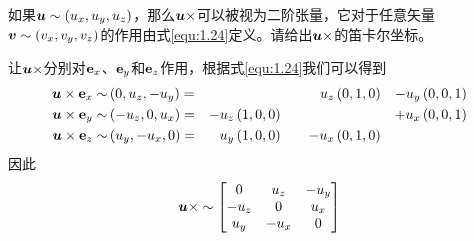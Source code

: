 \begin{example}
	如果$\bb{u}\sim \left( u_x,u_y,u_z \right) $，那么$\bb{u}\times $可以被视为二阶张量，它对于任意矢量$\bb{v}\sim \left( v_x,v_y,v_z \right) $的作用由式\eqref{equ:1.24}定义。请给出$\bb{u}\times $的笛卡尔坐标。
\end{example}
\begin{solution}
	让$\bb{u}\times $分别对$\bf{e}_x$、$\bf{e}_y$和$\bf{e}_z$作用，根据式\eqref{equ:1.24}我们可以得到
	\begin{equation*}
		\begin{matrix}
			\begin{aligned}
			\bb{u}\times \bf{e}_x\sim &\left( 0,u_z,-u_y \right) =\\
			\bb{u}\times \bf{e}_y\sim &\left( -u_z,0,u_x \right) =\\
			\bb{u}\times \bf{e}_z\sim &\left( u_y,-u_x,0 \right) =\\
		\end{aligned}&		\begin{aligned}
			\\
			-u_z&\left( 1,0,0 \right)\\
			u_y&\left( 1,0,0 \right)\\
		\end{aligned}&		\begin{aligned}
			u_z&\left( 0,1,0 \right)\\
			\\
			-u_x&\left( 0,1,0 \right)\\
		\end{aligned}&		\begin{aligned}
			-u_y&\left( 0,0,1 \right)\\
			+u_x&\left( 0,0,1 \right)\\
			\\
		\end{aligned}\\
		\end{matrix}
	\end{equation*}
	因此
	\begin{equation*}
		\bb{u}\times \sim \left[ \begin{matrix}
			0&		u_z&		-u_y\\
			-u_z&		0&		u_x\\
			u_y&		-u_x&		0\\
		\end{matrix} \right] 
	\end{equation*}
\end{solution}